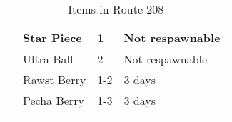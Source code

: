 \begin{longtable}{|| l l l l ||}%
\hline%
&Star Piece&1&Not respawnable\\%
\hline%
&Ultra Ball&2&Not respawnable\\%
\hline%
&Rawst Berry&1{-}2&3 days\\%
\hline%
&Pecha Berry&1{-}3&3 days\\%
\hline%
\endhead%
\hline%
\caption{Items in Route 208}%
\label{tab:Route208Items}%
\end{longtable}